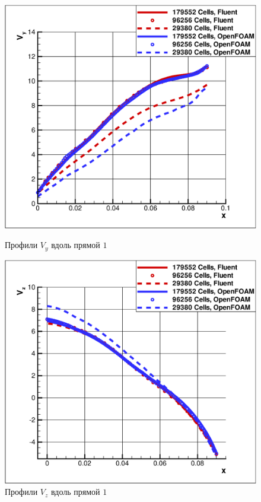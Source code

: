 \begin{figure}[h]
	\vspace{-1em}
	\begin{minipage}{0.475\linewidth}
		\includegraphics[scale=0.33]{cycloneMeshIndependence1}
		\caption{Профили $V_y$ вдоль прямой $1$}
		\label{fig:cycloneMeshIndependence1}
	\end{minipage}
	\hspace{0.5em}
	\begin{minipage}{0.475\linewidth}
		\includegraphics[scale=0.33]{cycloneMeshIndependence2}
		\caption{Профили $V_z$ вдоль прямой $1$}
		\label{fig:cycloneMeshIndependence2}
	\end{minipage}
\end{figure}


